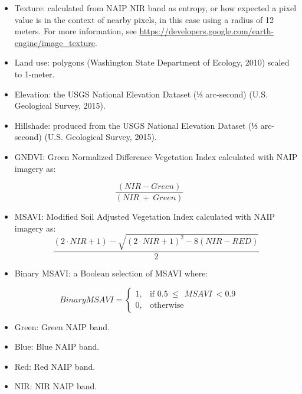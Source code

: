 \documentclass[
]{report}
\providecommand{\tightlist}{%
  \setlength{\itemsep}{0pt}\setlength{\parskip}{0pt}}
\begin{document}
\begin{itemize}
\tightlist
\item
  Texture: calculated from NAIP NIR band as entropy, or how expected a pixel value is in the context of nearby pixels, in this case using a radius of 12 meters. For more information, see \url{https://developers.google.com/earth-engine/image_texture}.
\item
  Land use: polygons (Washington State Department of Ecology, 2010) scaled to 1-meter.
\item
  Elevation: the USGS National Elevation Dataset (⅓ arc-second) (U.S. Geological Survey, 2015).
\item
  Hillshade: produced from the USGS National Elevation Dataset (⅓ arc-second) (U.S. Geological Survey, 2015).
\item
  GNDVI: Green Normalized Difference Vegetation Index calculated with NAIP imagery as:
\end{itemize}

\begin{equation}
\frac{\left(NIR-Green\right)}{\left(NIR\ +\ Green\right)}
\end{equation}

\begin{itemize}
\item
  MSAVI: Modified Soil Adjusted Vegetation Index calculated with NAIP imagery as:
  \begin{equation}
  \frac{\left(2\cdot NIR+1\right)-\sqrt{\left(2\cdot NIR+1\right)^2-8\left(NIR-RED\right)}}{2}
  \end{equation}
\item
  Binary MSAVI: a Boolean selection of MSAVI where:
\end{itemize}

\begin{equation}

   Binary MSAVI = 
\begin{cases}
    1,& \text{if  }0.5\ \le\ \ MSAVI\ <0.9\\
    0,              & \text{otherwise}
\end{cases}
\end{equation}

\begin{itemize}
\tightlist
\item
  Green: Green NAIP band.
\item
  Blue: Blue NAIP band.
\item
  Red: Red NAIP band.
\item
  NIR: NIR NAIP band.
\end{itemize}
\end{document}
